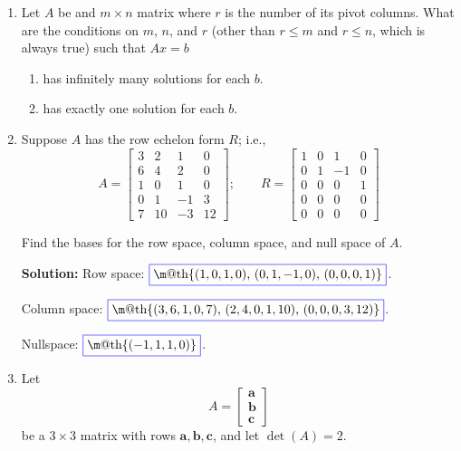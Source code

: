 \documentclass[14pt]{amsart}
\makeatletter
\newcommand{\?}{\stackrel{?}{=}}
\newcommand*{\boxedcolor}{blue}
\renewcommand{\boxed}[1]{\textcolor{\boxedcolor}{%
  \fbox{\normalcolor\m@th$\displaystyle#1$}}}
\makeatother
\begin{document}
\begin{enumerate}
\item  Let $A$ be and $m \times n$ matrix where $r$ is the number of its pivot columns.
What are the conditions on $m$, $n$, and $r$ (other than $r \leq m$ and $r \leq n$, which
is always true) such that $Ax = b$

\begin{enumerate}

\item  has infinitely many solutions for each $b$.

\item  has exactly one solution for each $b$.

\end{enumerate}

\pagebreak

\item  Suppose $A$ has the row echelon form $R$; i.e.,
%
\begin{equation*}
A = \begin{bmatrix}
3 & 2 & 1 & 0\\
6 & 4 & 2 & 0\\
1 & 0 & 1 & 0\\
0 & 1 & -1 & 3\\
7 & 10 & -3 & 12
\end{bmatrix};\qquad R = \begin{bmatrix}
1 & 0 & 1 & 0\\
0 & 1 & -1 & 0\\
0 & 0 & 0 & 1\\
0 & 0 & 0 & 0\\
0 & 0 & 0 & 0
\end{bmatrix}
\end{equation*}

Find the bases for the row space, column space, and null space of $A$.

\textbf{Solution:  }  Row space: $\boxed{\{(1, 0, 1, 0)$, $(0, 1, -1, 0)$, $(0, 0, 0, 1)\}}$.

Column space:  $\boxed{\{(3, 6, 1, 0, 7)$, $(2, 4, 0, 1, 10)$, $(0, 0, 0, 3, 12)\}}$.

Nullspace:  $\boxed{\{(-1, 1, 1, 0)\}}$.

\item  Let
%
\begin{equation*}
A = \begin{bmatrix}
\textbf{a}\\
\textbf{b}\\
\textbf{c}
\end{bmatrix}
\end{equation*}
%
be a $3 \times 3$ matrix with rows $\textbf{a}, \textbf{b}, \textbf{c}$, and let $\det(A) = 2$.


\end{enumerate}
\end{document}
